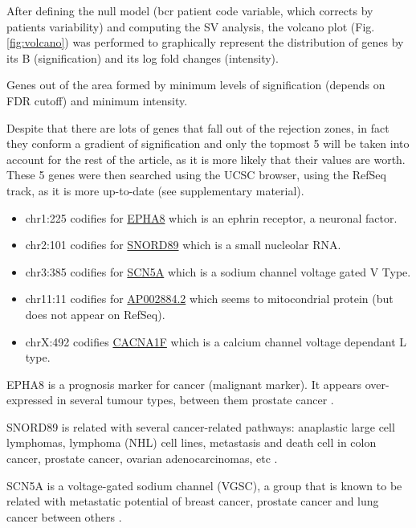 \documentclass[9pt,twocolumn,twoside]{gsajnl}
\begin{document}
After defining the null model (bcr patient code variable, which corrects by patients variability) and computing the SV analysis, the volcano plot (Fig. \ref{fig:volcano}) was performed to graphically represent the distribution of genes by its B (signification) and its log fold changes (intensity).

Genes out of the area formed by minimum levels of signification (depends on FDR cutoff) and minimum intensity.


Despite that there are lots of genes that fall out of the rejection zones, in fact they conform a gradient of signification and only the topmost 5 will be taken into account for the rest of the article, as it is more likely that their values are worth. These 5 genes were then searched using the UCSC browser, using the RefSeq track, as it is more up-to-date (see supplementary material).

\begin{itemize}
\item chr1:225 codifies for \href{http://www.genecards.org/cgi-bin/carddisp.pl?gene=EPHA8}{EPHA8} which is an ephrin receptor, a neuronal factor.
\item chr2:101 codifies for \href{http://www.genecards.org/cgi-bin/carddisp.pl?gene=SNORD89}{SNORD89} which is a small nucleolar RNA.
\item chr3:385 codifies for \href{http://www.genecards.org/cgi-bin/carddisp.pl?gene=SCN5A}{SCN5A} which is a sodium channel voltage gated V Type.
\item chr11:11 codifies for \href{http://www.ensembl.org/Homo_sapiens/Gene/Summary?g=ENSG00000255292;r=11:112086903-112193805}{AP002884.2} which seems to mitocondrial protein (but does not appear on RefSeq).
\item chrX:492 codifies \href{http://www.genecards.org/cgi-bin/carddisp.pl?gene=CACNA1F}{CACNA1F} which is a calcium channel voltage dependant L type.
\end{itemize}

EPHA8 is a prognosis marker for cancer (malignant marker). It appears over-expressed in several tumour types, between them prostate cancer \cite{proteinatlas,uhlen2015tissue}.

SNORD89 is related with several cancer-related pathways:  anaplastic large cell lymphomas, lymphoma (NHL) cell lines, metastasis and death cell in colon cancer, prostate cancer, ovarian adenocarcinomas, etc \cite{tcng}.

SCN5A is a voltage-gated sodium channel (VGSC), a group that is known to be related with metastatic potential of breast cancer, prostate cancer and lung cancer between others \cite{Nelson2015}.
\end{document}
